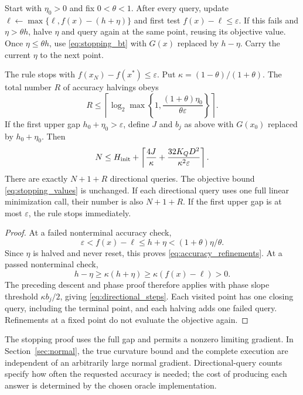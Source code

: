 Start with $\eta_0>0$ and fix $0<\theta<1$. After every query, update
$\ell\leftarrow\max\{\ell,f(x)-(h+\eta)\}$ and first test
$f(x)-\ell\le\varepsilon$. If this fails and $\eta>\theta h$,
halve $\eta$ and query again at the same point, reusing its objective
value. Once $\eta\le\theta h$, use \eqref{eq:stopping_bt} with
$G(x)$ replaced by $h-\eta$. Carry the current $\eta$ to the next point.

\begin{corollary}
\label{cor:directional_stopping}
The rule stops with $f(x_N)-f(x^*)\le\varepsilon$.
Put $\kappa=(1-\theta)/(1+\theta)$. The total number $R$ of accuracy
halvings obeys
\begin{equation}\label{eq:accuracy_refinements}
 R\le\left\lceil\log_2\max\left\{1,
 \frac{(1+\theta)\eta_0}{\theta\varepsilon}\right\}\right\rceil.
\end{equation}
If the first upper gap $h_0+\eta_0>\varepsilon$, define $J$ and $b_j$
as above with $G(x_0)$ replaced by $h_0+\eta_0$. Then
\begin{equation}\label{eq:directional_steps}
 N\le H_{\rm init}+\left\lceil
 \frac{4J}{\kappa}+\frac{32K_QD^2}{\kappa^2\varepsilon}
 \right\rceil.
\end{equation}
There are exactly $N+1+R$ directional queries. The objective bound
\eqref{eq:stopping_values} is unchanged. If each directional query uses
one full linear minimization call, their number is also $N+1+R$.
If the first upper gap is at most $\varepsilon$, the rule stops immediately.
\end{corollary}
\begin{proof}
At a failed nonterminal accuracy check,
\[
 \varepsilon<f(x)-\ell\le h+\eta
 <(1+\theta)\eta/\theta.
\]
Since $\eta$ is halved and never reset, this proves
\eqref{eq:accuracy_refinements}. At a passed nonterminal check,
\[
 h-\eta\ge\kappa(h+\eta)\ge\kappa(f(x)-\ell)>0.
\]
The preceding descent and phase proof therefore applies with phase
slope threshold $\kappa b_j/2$, giving
\eqref{eq:directional_steps}. Each visited point has one closing query,
including the terminal point, and each halving adds one failed query.
Refinements at a fixed point do not evaluate the objective again.
\end{proof}

The stopping proof uses the full gap and permits a nonzero limiting
gradient. In Section~\ref{sec:normal}, the true curvature bound and the
complete execution are independent of an arbitrarily large normal
gradient. Directional-query counts specify how often the requested
accuracy is needed; the cost of producing each answer is determined by
the chosen oracle implementation.
